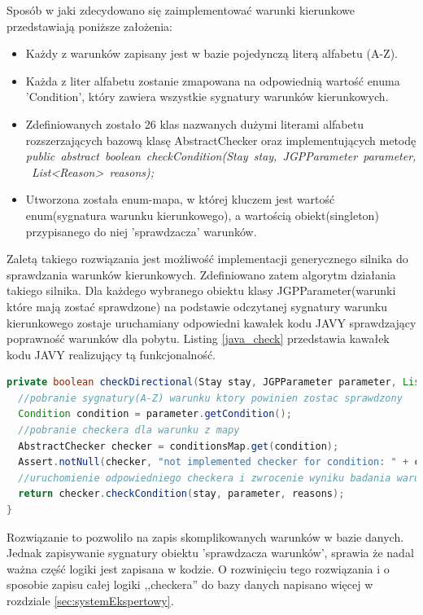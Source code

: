 Sposób w jaki zdecydowano się zaimplementować warunki kierunkowe przedstawiają poniższe założenia:
\begin{itemize}
\item Każdy z warunków zapisany jest w bazie pojedynczą literą alfabetu (A-Z).
\item Każda z liter alfabetu zostanie zmapowana na odpowiednią wartość enuma 'Condition', który zawiera wszystkie sygnatury warunków kierunkowych.
\item Zdefiniowanych zostało 26 klas nazwanych dużymi literami alfabetu rozszerzających bazową klasę AbstractChecker oraz implementujących metodę \mbox{\textit{public abstract boolean checkCondition(Stay stay, JGPParameter parameter, List<Reason> reasons);}}
\item Utworzona została enum-mapa, w której kluczem jest wartość enum(sygnatura warunku kierunkowego), a wartością obiekt(singleton) przypisanego do niej 'sprawdzacza' warunków.
\end{itemize}
Zaletą takiego rozwiązania jest możliwość implementacji generycznego silnika do sprawdzania warunków kierunkowych. Zdefiniowano zatem algorytm działania takiego silnika. Dla każdego wybranego obiektu klasy \mbox{JGPParameter}(warunki które mają zostać sprawdzone) na podstawie odczytanej sygnatury warunku kierunkowego zostaje uruchamiany odpowiedni kawałek kodu JAVY sprawdzający poprawność warunków dla pobytu. Listing \ref{java_check} przedstawia kawałek kodu JAVY realizujący tą funkcjonalność.

\begin{lstlisting}[language=Java,caption={Metoda sprawdzająca warunki kierunkowe.},label=java_check]
private boolean checkDirectional(Stay stay, JGPParameter parameter, List<Reason> reasons) {
  //pobranie sygnatury(A-Z) warunku ktory powinien zostac sprawdzony
  Condition condition = parameter.getCondition();
  //pobranie checkera dla warunku z mapy
  AbstractChecker checker = conditionsMap.get(condition);
  Assert.notNull(checker, "not implemented checker for condition: " + condition);
  //uruchomienie odpowiedniego checkera i zwrocenie wyniku badania warunku
  return checker.checkCondition(stay, parameter, reasons);
}
\end{lstlisting}

Rozwiązanie to pozwoliło na zapis skomplikowanych warunków w bazie danych. Jednak zapisywanie sygnatury obiektu 'sprawdzacza warunków', sprawia że nadal ważna część logiki jest zapisana w kodzie. O rozwinięciu tego rozwiązania  i o sposobie zapisu całej logiki ,,checkera'' do bazy danych napisano więcej w rozdziale \ref{sec:systemEkspertowy}.

